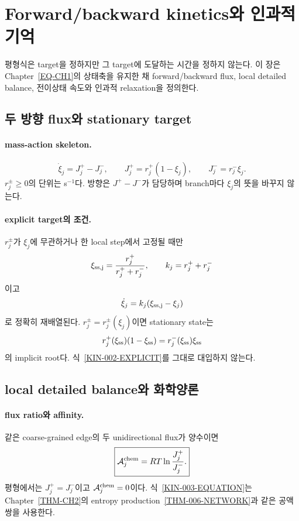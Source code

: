 \section{Forward/backward kinetics와 인과적 기억}\label{KIN-CH3}

평형식은 target을 정하지만 그 target에 도달하는 시간을 정하지
않는다. 이 장은 Chapter~\ref{EQ-CH1}의 상태축을 유지한 채
forward/backward flux, local detailed balance, 전이상태 속도와
인과적 relaxation을 정의한다.

\subsection{두 방향 flux와 stationary target}\label{KIN-CH3-RATES}

\paragraph{ mass-action skeleton.}
\begin{equation}
\boxed{
\dot\xi_j=J_j^+-J_j^-,
\qquad
J_j^+=r_j^+(1-\xi_j),
\qquad
J_j^-=r_j^-\xi_j.
}
\label{KIN-001-EQUATION}
\end{equation}
$r_j^\pm\ge0$의 단위는 s$^{-1}$다. 방향은
$J^+-J^-$가 담당하며 branch마다 $\xi_j$의 뜻을 바꾸지 않는다.

\paragraph{ explicit target의 조건.}
$r_j^\pm$가 $\xi_j$에 무관하거나 한 local step에서 고정될 때만
\begin{equation}
\xi_{\rm ss,j}=\frac{r_j^+}{r_j^++r_j^-},
\qquad
k_j=r_j^++r_j^-
\label{KIN-002-EXPLICIT}
\end{equation}
이고
\[
\dot\xi_j=k_j(\xi_{\rm ss,j}-\xi_j)
\]
로 정확히 재배열된다. $r_j^\pm=r_j^\pm(\xi_j)$이면 stationary
state는
\begin{equation}
r_j^+(\xi_{\rm ss})(1-\xi_{\rm ss})
=r_j^-(\xi_{\rm ss})\xi_{\rm ss}
\label{KIN-002-IMPLICIT}
\end{equation}
의 implicit root다. 식~\eqref{KIN-002-EXPLICIT}를 그대로
대입하지 않는다.

\subsection{local detailed balance와 화학양론}\label{KIN-CH3-BALANCE}

\paragraph{ flux ratio와 affinity.}
같은 coarse-grained edge의 두 unidirectional flux가 양수이면
\begin{equation}
\boxed{
\mathcal A_j^{\mathrm{chem}}
=RT\ln\frac{J_j^+}{J_j^-}.
}
\label{KIN-003-EQUATION}
\end{equation}
평형에서는 $J_j^+=J_j^-$이고 $\mathcal A_j^{\mathrm{chem}}=0$이다.
식~\eqref{KIN-003-EQUATION}는 Chapter~\ref{THM-CH2}의
entropy production~\eqref{THM-006-NETWORK}과 같은 공액쌍을
사용한다.

